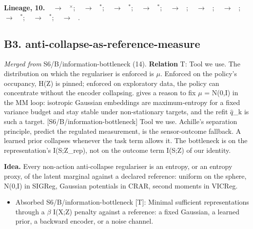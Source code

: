 \documentclass[10pt]{article}
\newcommand{\memb}[1]{\par\smallskip\textbf{#1}\quad}
\begin{document}
\memb{Lineage, 10.} {\footnotesize \citeauthor{Pathak-curiosity17}~\citeyear{Pathak-curiosity17} $\to$ \citeauthor{Burda-large19}~\citeyear{Burda-large19}$^\times$; \citeauthor{Pathak-curiosity17}~\citeyear{Pathak-curiosity17} $\to$ \citeauthor{Efroni-provable22}~\citeyear{Efroni-provable22}$^\ast$; \citeauthor{Pathak-curiosity17}~\citeyear{Pathak-curiosity17} $\to$ \citeauthor{Ivashkov-smwm26}~\citeyear{Ivashkov-smwm26}$^\ast$; \citeauthor{Dietterich-discovering18}~\citeyear{Dietterich-discovering18} $\to$ \citeauthor{Efroni-provable22}~\citeyear{Efroni-provable22}$^\ast$; \citeauthor{Efroni-provable22}~\citeyear{Efroni-provable22} $\to$ \citeauthor{Lamb-guaranteed23}~\citeyear{Lamb-guaranteed23}; \citeauthor{Efroni-provable22}~\citeyear{Efroni-provable22} $\to$ \citeauthor{Misra-towards24}~\citeyear{Misra-towards24}; \citeauthor{Lamb-guaranteed23}~\citeyear{Lamb-guaranteed23} $\to$ \citeauthor{Levine-multistep24}~\citeyear{Levine-multistep24}; \citeauthor{Misra-towards24}~\citeyear{Misra-towards24} $\to$ \citeauthor{Nikulin-latent25}~\citeyear{Nikulin-latent25}$^\ast$; \citeauthor{Ivashkov-smwm26}~\citeyear{Ivashkov-smwm26} $\to$ \citeauthor{Boylan-gaussian26}~\citeyear{Boylan-gaussian26}$^\ast$; \citeauthor{Maes-leworldmodel26}~\citeyear{Maes-leworldmodel26} $\to$ \citeauthor{Boylan-gaussian26}~\citeyear{Boylan-gaussian26}.}

\subsection{B3. anti-collapse-as-reference-measure}\label{node:S6-S6-B-anti-collapse-as-reference-measure}
\textit{Merged from} S6/B/information-bottleneck (14). \textbf{Relation} \textsf{T}: Tool we use. The distribution on which the regulariser is enforced is \ensuremath{\mu}. Enforced on the policy's occupancy, H(Z) is pinned; enforced on exploratory data, the policy can concentrate without the encoder collapsing. \citet{Pasand-stable26} gives a reason to fix \ensuremath{\mu} = N(0,I) in the MM loop: isotropic Gaussian embeddings are maximum-entropy for a fixed variance budget and stay stable under non-stationary targets, and the refit \ensuremath{\hat{q}}\_k is such a target. [S6/B/information-bottleneck] Tool we use. Achille's separation principle, predict the regulated measurement, is the sensor-outcome fallback. A learned prior collapses whenever the task term allows it. The bottleneck is on the representation's I(S;Z\_rep), not on the outcome term I(S;Z) of our identity.

\textbf{Idea.} Every non-action anti-collapse regulariser is an entropy, or an entropy proxy, of the latent marginal against a declared reference: uniform on the sphere, N(0,I) in SIGReg, Gaussian potentials in CRAR, second moments in VICReg.
\begin{itemize}[nosep,leftmargin=1.2em]
\item Absorbed S6/B/information-bottleneck [T]: Minimal sufficient representations through a \ensuremath{\beta} I(X;Z) penalty against a reference: a fixed Gaussian, a learned prior, a backward encoder, or a noise channel.
\end{itemize}
\end{document}

